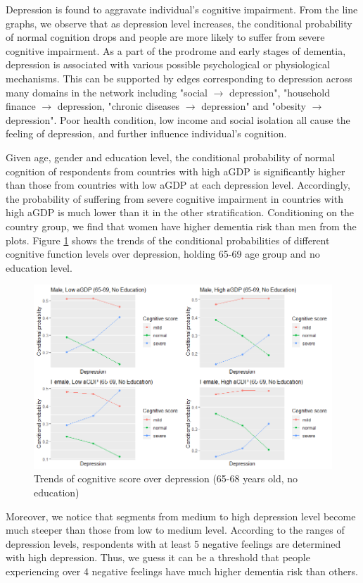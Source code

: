 \documentclass[11pt,twoside]{article}
\numberwithin{Theorem}{section}
\numberwithin{Definition}{section}
\numberwithin{Lemma}{section}
\numberwithin{Algorithm}{section}
\numberwithin{equation}{section}
\begin{document}
Depression is found to aggravate individual's cognitive impairment. From the line graphs, we observe that as depression level increases, the conditional probability of normal cognition drops and people are more likely to suffer from severe cognitive impairment. As a part of the prodrome and early stages of dementia, depression is associated with various possible psychological or physiological mechanisms. This can be supported by edges corresponding to depression across many domains in the network including "social $\rightarrow$ depression", "household finance $\rightarrow$ depression, "chronic diseases $\rightarrow$ depression" and "obesity $\rightarrow$ depression".  Poor health condition, low income and social isolation all cause the feeling of depression, and further influence individual's cognition.

Given age, gender and education level, the conditional probability of normal cognition of respondents from countries with high aGDP is significantly higher than those from countries with low aGDP at each depression level. Accordingly, the probability of suffering from severe cognitive impairment in countries with high aGDP is much lower than it in the other stratification. Conditioning on the country group, we find that women have higher dementia risk than men from the plots. Figure \ref{fig:depression1} shows the trends of the conditional probabilities of different cognitive function levels over depression, holding 65-69 age group and no education level.

\begin{figure}[!h]
	\centering
	\includegraphics[width = 0.85 \textwidth]{Images/depression1.png}
	\caption{Trends of cognitive score over depression (65-68 years old, no education)}
	\label{fig:depression1}
\end{figure}

Moreover, we notice that segments from medium to high depression level become much steeper than those from low to medium level. According to the ranges of depression levels, respondents with at least 5 negative feelings are determined with high depression. Thus, we guess it can be a threshold that people experiencing over 4 negative feelings have much higher dementia risk than others.
\end{document}
